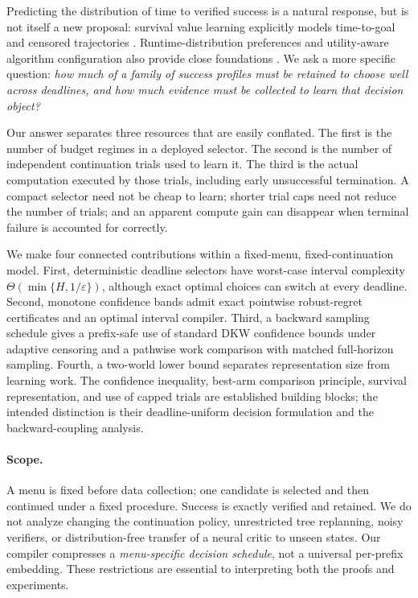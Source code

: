 \documentclass[11pt]{article}
\theoremstyle{definition}\newtheorem{definition}[theorem]{Definition}
\newcommand{\eps}{\varepsilon}
\begin{document}
Predicting the distribution of time to verified success is a natural response, but is not itself a new proposal: survival value learning explicitly models time-to-goal and censored trajectories \citep{tiofack2026}. Runtime-distribution preferences and utility-aware algorithm configuration also provide close foundations \citep{graham2023preferences,graham2023utilitarian,graham2025practical}. We ask a more specific question: \emph{how much of a family of success profiles must be retained to choose well across deadlines, and how much evidence must be collected to learn that decision object?}

Our answer separates three resources that are easily conflated. The first is the number of budget regimes in a deployed selector. The second is the number of independent continuation trials used to learn it. The third is the actual computation executed by those trials, including early unsuccessful termination. A compact selector need not be cheap to learn; shorter trial caps need not reduce the number of trials; and an apparent compute gain can disappear when terminal failure is accounted for correctly.

We make four connected contributions within a fixed-menu, fixed-continuation model. First, deterministic deadline selectors have worst-case interval complexity $\Theta(\min\{H,1/\eps\})$, although exact optimal choices can switch at every deadline. Second, monotone confidence bands admit exact pointwise robust-regret certificates and an optimal interval compiler. Third, a backward sampling schedule gives a prefix-safe use of standard DKW confidence bounds under adaptive censoring and a pathwise work comparison with matched full-horizon sampling. Fourth, a two-world lower bound separates representation size from learning work. The confidence inequality, best-arm comparison principle, survival representation, and use of capped trials are established building blocks; the intended distinction is their deadline-uniform decision formulation and the backward-coupling analysis.

\paragraph{Scope.} A menu is fixed before data collection; one candidate is selected and then continued under a fixed procedure. Success is exactly verified and retained. We do not analyze changing the continuation policy, unrestricted tree replanning, noisy verifiers, or distribution-free transfer of a neural critic to unseen states. Our compiler compresses a \emph{menu-specific decision schedule}, not a universal per-prefix embedding. These restrictions are essential to interpreting both the proofs and experiments.
\end{document}
